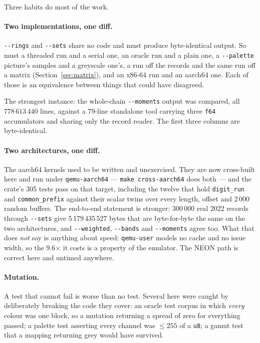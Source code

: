 \documentclass[11pt,a4paper]{article}
\newcommand{\bin}[1]{\texttt{#1}}
\newcommand{\flag}[1]{\texttt{-{}-#1}}
\begin{document}
Three habits do most of the work.

\paragraph{Two implementations, one diff.} \flag{rings} and \flag{sets} share no
code and must produce byte-identical output. So must a threaded run and a serial
one, an oracle run and a plain one, a \flag{palette} picture's samples and a
greyscale one's, a run off the records and the same run off a matrix
(Section~\ref{sec:matrix}), and an x86-64 run and an aarch64 one. Each of those
is an equivalence between things that could have disagreed.

The strongest instance: the whole-chain \flag{moments} output was compared, all
$778\,613\,440$ lines, against a 79-line standalone tool carrying three
\texttt{f64} accumulators and sharing only the record reader. The first three
columns are byte-identical.

\paragraph{Two architectures, one diff.} The aarch64 kernels used to be written
and unexercised. They are now cross-built here and run under \texttt{qemu-aarch64}
--- \texttt{make cross-aarch64} does both --- and the crate's 305 tests pass on
that target, including the twelve that hold \bin{digit\_run} and
\bin{common\_prefix} against their scalar twins over every length, offset and
2\,000 random buffers. The end-to-end statement is stronger: 300\,000 real 2022
records through \flag{sets} give 5\,179\,435\,527 bytes that are byte-for-byte
the same on the two architectures, and \flag{weighted}, \flag{bands} and
\flag{moments} agree too. What that does \emph{not} say is anything about speed:
\texttt{qemu-user} models no cache and no issue width, so the 9.6$\times$ it costs
is a property of the emulator. The NEON path is correct here and untimed
anywhere.

\paragraph{Mutation.} A test that cannot fail is worse than no test. Several
here were caught by deliberately breaking the code they cover: an oracle test
corpus in which \emph{every} colour was one block, so a mutation returning a
spread of zero for everything passed; a palette test asserting every channel was
$\le 255$ of a \texttt{u8}; a gamut test that a mapping returning grey would have
survived.
\end{document}
